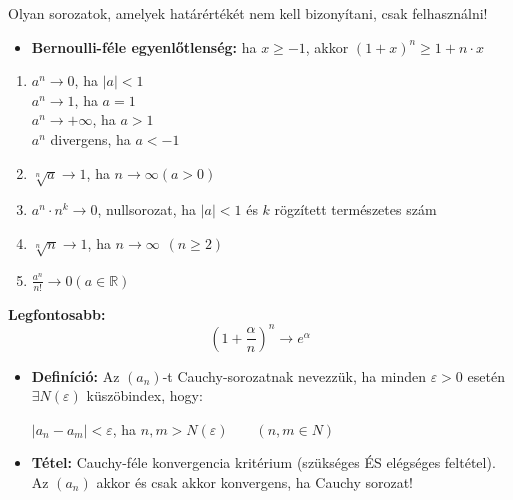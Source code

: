 \documentclass[12pt,a4paper]{article}
\begin{document}
\begin{tcolorbox}[colback=green!5!white,colframe=green!60!black,title= 3. Nevezetes sorozatok]
    Olyan sorozatok, amelyek határértékét nem kell bizonyítani, csak felhasználni!
    \begin{itemize}
        \item \textbf{Bernoulli-féle egyenlőtlenség:} ha \(x \geq  -1\), akkor \((1+x)^n \geq 1 + n\cdot x\)
    \end{itemize}
    \begin{enumerate}
        \item \(a^n \to 0\), ha \(\left\lvert a\right\rvert <1\)\\
        \(a^n \to 1\), ha \(a=1\)\\
        \(a^n \to +\infty\), ha \(a>1\)\\
        \(a^n\) divergens, ha \(a<-1\)
        \item \(\sqrt[n]{a} \to 1\), ha \(n \to \infty (a>0)\)
        \item \(a^n\cdot n^k \rightarrow 0\), nullsorozat, ha \(\left\lvert a\right\rvert <1 \) és \(k\) rögzített természetes szám
        \item \(\sqrt[n]{n} \to 1\), ha \(n \to \infty \hspace{5pt}(n\geq 2)\)
        \item \(\frac{a^n}{n!} \to 0 (a \in \mathbb{R} )\)
    \end{enumerate}
    \textbf{Legfontosabb:}
    $$(1+\frac{\alpha}{n})^n \to e^{\alpha}$$
\end{tcolorbox}

\begin{tcolorbox}[colback=green!5!white,colframe=green!60!black,title= 4. Cauchy sorozat]
    \begin{itemize}
        \item \textbf{Definíció:} Az \((a_n)\)-t Cauchy-sorozatnak nevezzük, ha minden \(\varepsilon > 0\) esetén \(\exists N(\varepsilon)\) küszöbindex, hogy: 
        \begin{center}
            \(\left\lvert a_n -a_m\right\rvert  < \varepsilon\), ha \(n,m > N(\varepsilon)\) \(\hspace{15pt}\) \((n,m \in N)\)
        \end{center}
        \item \textbf{Tétel:} Cauchy-féle konvergencia kritérium (szükséges ÉS elégséges feltétel). Az \((a_n)\) akkor és csak akkor konvergens, ha Cauchy sorozat!
    \end{itemize}
\end{tcolorbox}
\end{document}
